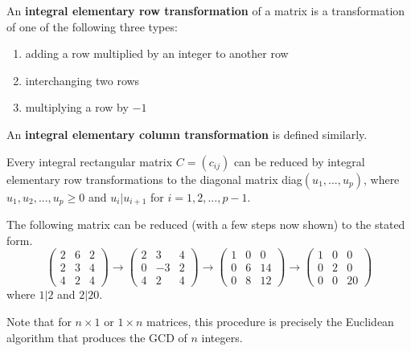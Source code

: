   \begin{definition}
    An \textbf{integral elementary row transformation} of a matrix is a transformation of one of the following three types: 
    \begin{enumerate}
      \item adding a row multiplied by an integer to another row
      \item interchanging two rows
      \item multiplying a row by $-1$ 
    \end{enumerate}
    An \textbf{integral elementary column transformation} is defined similarly. 
  \end{definition}

  \begin{lemma}
    Every integral rectangular matrix $C = (c_{i j})$ can be reduced by integral elementary row transformations to the diagonal matrix diag$(u_1, ..., u_p)$, where $u_1, u_2, ..., u_p \geq 0$ and $u_i | u_{i+1}$ for $i = 1, 2, ..., p -1$. 
  \end{lemma}

  \begin{example}
    The following matrix can be reduced (with a few steps now shown) to the stated form. 
    \begin{equation}
    \begin{pmatrix} 2&6&2 \\ 2&3&4 \\ 4&2&4 \end{pmatrix} \rightarrow 
    \begin{pmatrix} 2&3&4 \\ 0&-3&2 \\ 4&2&4 \end{pmatrix} \rightarrow
    \begin{pmatrix} 1&0&0 \\ 0&6&14 \\ 0&8&12 \end{pmatrix} \rightarrow
    \begin{pmatrix} 1&0&0 \\ 0&2&0 \\ 0&0&20\end{pmatrix}
    \end{equation}
    where $1|2$ and $2|20$. 
  \end{example}

  Note that for $n \times 1$ or $1 \times n$ matrices, this procedure is precisely the Euclidean algorithm that produces the GCD of $n$ integers. 

